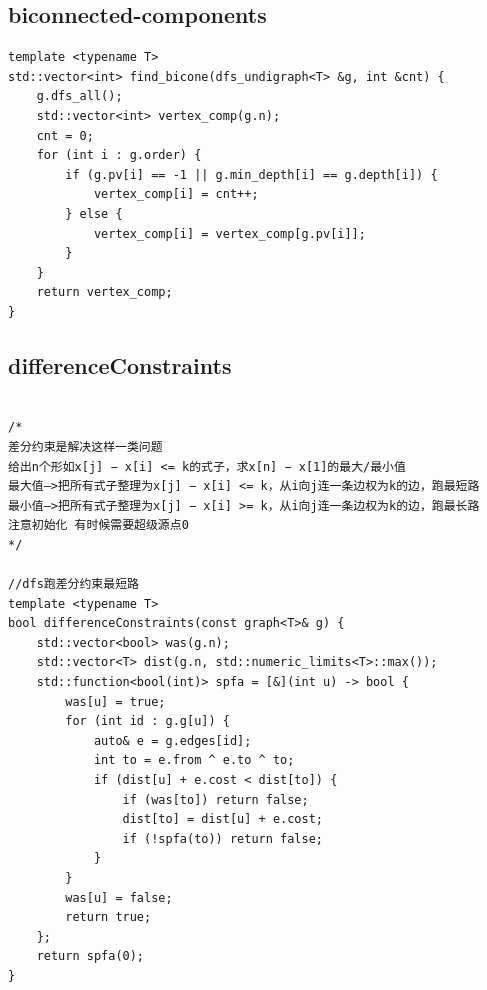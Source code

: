 \documentclass[twoside]{article}
\begin{document}
\subsection{biconnected-components}
\begin{lstlisting}
template <typename T>
std::vector<int> find_bicone(dfs_undigraph<T> &g, int &cnt) {
    g.dfs_all();
    std::vector<int> vertex_comp(g.n);
    cnt = 0;
    for (int i : g.order) {
        if (g.pv[i] == -1 || g.min_depth[i] == g.depth[i]) {
            vertex_comp[i] = cnt++;
        } else {
            vertex_comp[i] = vertex_comp[g.pv[i]];
        }
    }
    return vertex_comp;
}
\end{lstlisting}
\subsection{differenceConstraints}
\begin{lstlisting}
  
/*
差分约束是解决这样一类问题
给出n个形如x[j] − x[i] <= k的式子，求x[n] − x[1]的最大/最小值
最大值—>把所有式子整理为x[j] − x[i] <= k，从i向j连一条边权为k的边，跑最短路
最小值—>把所有式子整理为x[j] − x[i] >= k，从i向j连一条边权为k的边，跑最长路
注意初始化 有时候需要超级源点0
*/

//dfs跑差分约束最短路
template <typename T>
bool differenceConstraints(const graph<T>& g) {
    std::vector<bool> was(g.n);
    std::vector<T> dist(g.n, std::numeric_limits<T>::max());
    std::function<bool(int)> spfa = [&](int u) -> bool {
        was[u] = true;
        for (int id : g.g[u]) {
            auto& e = g.edges[id];
            int to = e.from ^ e.to ^ to;
            if (dist[u] + e.cost < dist[to]) {
                if (was[to]) return false;
                dist[to] = dist[u] + e.cost;
                if (!spfa(to)) return false;
            }
        }
        was[u] = false;
        return true;
    };
    return spfa(0);
}\end{lstlisting}
\end{document}
